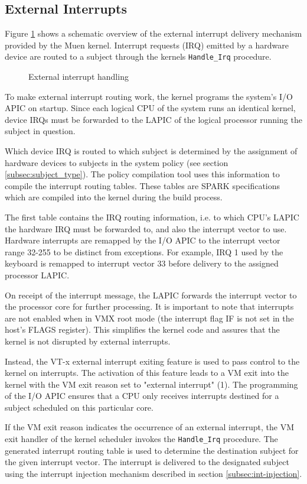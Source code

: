\subsection{External Interrupts}\label{subsec:external-ints}
Figure \ref{fig:external-interrupt} shows a schematic overview of the external
interrupt delivery mechanism provided by the Muen kernel. Interrupt requests
(IRQ) emitted by a hardware device are routed to a subject through
the kernels \texttt{Handle\_Irq} procedure.

\begin{figure}[h]
	\centering
	
	\caption{External interrupt handling}
	\label{fig:external-interrupt}
\end{figure}

To make external interrupt routing work, the kernel programs the system's I/O
APIC on startup. Since each logical CPU of the system runs an identical kernel,
device IRQs must be forwarded to the LAPIC of the logical processor running the
subject in question.

Which device IRQ is routed to which subject is determined by the assignment of
hardware devices to subjects in the system policy (see section
\ref{subsec:subject_type}). The policy compilation tool uses this information to
compile the interrupt routing tables. These tables are SPARK specifications
which are compiled into the kernel during the build process.

The first table contains the IRQ routing information, i.e. to which CPU's LAPIC
the hardware IRQ must be forwarded to, and also the interrupt vector to use.
Hardware interrupts are remapped by the I/O APIC to the interrupt vector range
32-255 to be distinct from exceptions. For example, IRQ 1 used by the keyboard
is remapped to interrupt vector 33 before delivery to the assigned processor
LAPIC.

On receipt of the interrupt message, the LAPIC forwards the interrupt vector to
the processor core for further processing. It is important to note that
interrupts are not enabled when in VMX root mode (the interrupt flag
IF is not set in the host's FLAGS register). This simplifies the
kernel code and assures that the kernel is not disrupted by external interrupts.

Instead, the VT-x external interrupt exiting feature is used to pass control to
the kernel on interrupts. The activation of this feature leads to a VM exit
into the kernel with the VM exit reason set to "external interrupt" (1).  The
programming of the I/O APIC ensures that a CPU only receives interrupts
destined for a subject scheduled on this particular core.

If the VM exit reason indicates the occurrence of an external interrupt, the VM
exit handler of the kernel scheduler invokes the \texttt{Handle\_Irq} procedure.
The generated interrupt routing table is used to determine the destination
subject for the given interrupt vector. The interrupt is delivered to the
designated subject using the interrupt injection mechanism described in section
\ref{subsec:int-injection}.
